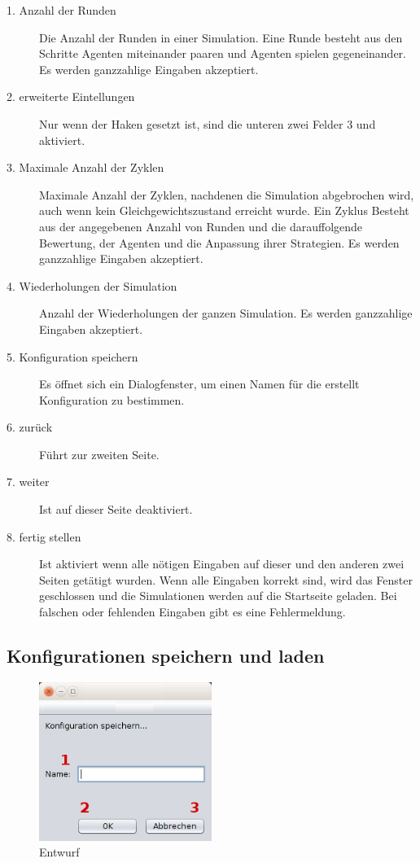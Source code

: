 \begin{description}

\item[1. Anzahl der Runden] Die Anzahl der Runden in einer Simulation. Eine Runde besteht aus den Schritte Agenten miteinander paaren und Agenten spielen gegeneinander. Es werden ganzzahlige Eingaben akzeptiert.

\item[2. erweiterte Eintellungen] Nur wenn der Haken gesetzt ist, sind die unteren zwei Felder 3 und  aktiviert.

\item[3. Maximale Anzahl der Zyklen] Maximale Anzahl der Zyklen, nachdenen die Simulation abgebrochen wird, auch wenn kein Gleichgewichtszustand erreicht wurde. Ein Zyklus Besteht aus der angegebenen Anzahl von Runden und die darauffolgende Bewertung, der Agenten und die Anpassung ihrer Strategien. Es werden ganzzahlige Eingaben akzeptiert.

\item[4. Wiederholungen der Simulation] Anzahl der Wiederholungen der ganzen Simulation. Es werden ganzzahlige Eingaben akzeptiert.

\item[5. Konfiguration speichern] Es öffnet sich ein Dialogfenster, um einen Namen für die erstellt Konfiguration zu bestimmen.

\item[6. zurück] Führt zur zweiten Seite.

\item[7. weiter] Ist auf dieser Seite deaktiviert.

\item[8. fertig stellen] Ist aktiviert wenn alle nötigen Eingaben auf dieser und den anderen zwei Seiten getätigt wurden. Wenn alle Eingaben korrekt sind, wird das Fenster geschlossen und die Simulationen werden auf die Startseite geladen. Bei falschen oder fehlenden Eingaben gibt es eine Fehlermeldung.

\end{description}


\subsection{Konfigurationen speichern und laden}

\begin{figure}[hp] 
  \centering
     \includegraphics[width=0.5\textwidth]{GUI_Entwurf/KonfigSpeichern.png}
  \caption{Entwurf}
  \label{fig:Bild1}
\end{figure}

